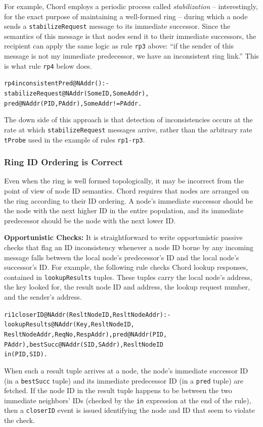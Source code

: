\documentclass{sig-alt-full}
\renewcommand{\paragraph}[1]{{\bf #1:}}
\newenvironment{overlog}{\begin{alltt}\footnotesize}{\end{alltt}}
\newcommand{\ol}[1]{{\tt\footnotesize#1}}
\begin{document}
For example, Chord employs a periodic process called
\emph{stabilization} -- interestingly, for the
exact purpose of maintaining a well-formed ring --
during which a node sends a 
\ol{stabilizeRequest} message to its immediate successor.
Since the semantics of this message is that nodes
send it to their immediate successors, the recipient
can apply the same logic as rule \ol{rp3} above:
``if the sender of this message is not my immediate
predecessor, we have an inconsistent ring link.''
This is what rule \ol{rp4} below does.
\begin{overlog}
rp4 inconsistentPred@NAddr() :-
   stabilizeRequest@NAddr(SomeID, SomeAddr),
   pred@NAddr(PID, PAddr), SomeAddr != PAddr.
\end{overlog}
The down side of this approach is that detection of
inconsistencies occurs at the rate at which
\ol{stabilizeRequest} messages arrive, rather than
the arbitrary rate \ol{tProbe} used in the example
of rules \ol{rp1-rp3}.



\subsubsection{Ring ID Ordering is Correct}
\label{sec:consistency:ordering}

Even when the ring is well formed topologically, it
may be incorrect from the point of view of node ID
semantics.  Chord requires that nodes are arranged
on the ring according to their ID ordering.  A
node's immediate successor should be the node with
the next higher ID in the entire population, and its
immediate predecessor should be the node with the
next lower ID.

\paragraph{Opportunistic Checks} It is straightforward
to write opportunistic
passive checks that flag an ID inconsistency
whenever a node ID borne by any incoming message
falls between the local node's predecessor's ID
and the local node's successor's ID.  For
example, the following rule checks Chord lookup
responses, contained in \ol{lookupResults}
tuples. These tuples carry the
local node's address, the key looked for, the result
node ID and address, the lookup request number, and
the sender's address.
\begin{overlog}
ri1 closerID@NAddr(ResltNodeID, ResltNodeAddr) :-
   lookupResults@NAddr(Key, ResltNodeID,
   ResltNodeAddr, ReqNo, RespAddr), pred@NAddr(PID,
   PAddr), bestSucc@NAddr(SID, SAddr), ResltNodeID
   in (PID, SID).
\end{overlog}
When such a result tuple arrives at a node, the node's immediate
successor ID (in a \ol{bestSucc} tuple) and its
immediate predecessor ID (in a \ol{pred} tuple) are fetched.  If the node
ID in the result tuple happens to be between the two immediate
neighbors' IDs (checked by the
\ol{in} expression at the end of the rule), then a \ol{closerID} event is
issued identifying the node and ID that seem to violate the check.
\end{document}
